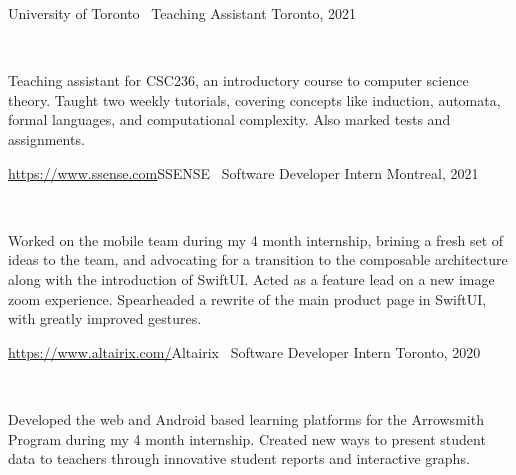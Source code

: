 \documentclass[]{style}
\begin{document}
\begin{entrylist}


\vspace{2mm}

\entry
{University of Toronto \ {\normalfont Teaching Assistant}}
{Toronto, 2021}
{ ~ \vspace{-2.5mm}

  

Teaching assistant for CSC236, an introductory course to computer science theory. Taught two weekly tutorials, covering concepts like induction, automata, formal languages, and computational complexity. Also marked tests and assignments. 
}


\entry
{\url{https://www.ssense.com}{SSENSE}\vspace{1mm} \ {\normalfont Software Developer Intern}}
{Montreal, 2021}
{ ~ \vspace{-2.5mm}

    

Worked on the mobile team during my 4 month internship, brining a fresh set of ideas to the team, and advocating for a transition to the composable architecture along with the introduction of SwiftUI. Acted as a feature lead on a new image zoom experience. Spearheaded a rewrite of the main product page in SwiftUI, with greatly improved gestures.}

%
%
%


\entry
{\url{https://www.altairix.com/}{Altairix} \vspace{1mm} \ {\normalfont Software Developer Intern}}
{Toronto, 2020}
{ ~ \vspace{-2.5mm}

  

Developed the web and Android based learning platforms for the Arrowsmith Program during my 4 month internship. Created new ways to present student data to teachers through innovative student reports and interactive graphs.}

\end{entrylist}
\end{document}
